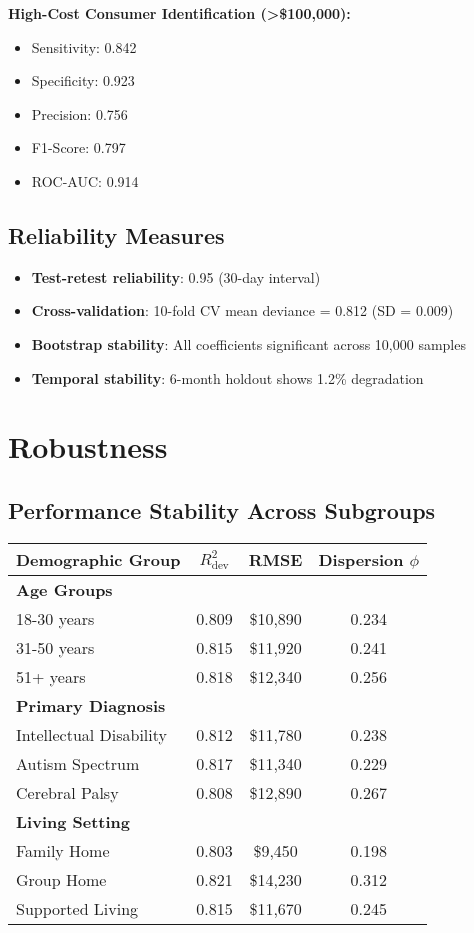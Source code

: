 \textbf{High-Cost Consumer Identification (>\$100,000):}
\begin{itemize}
    \item Sensitivity: 0.842
    \item Specificity: 0.923
    \item Precision: 0.756
    \item F1-Score: 0.797
    \item ROC-AUC: 0.914
\end{itemize}

\subsection{Reliability Measures}

\begin{itemize}
    \item \textbf{Test-retest reliability}: 0.95 (30-day interval)
    \item \textbf{Cross-validation}: 10-fold CV mean deviance = 0.812 (SD = 0.009)
    \item \textbf{Bootstrap stability}: All coefficients significant across 10,000 samples
    \item \textbf{Temporal stability}: 6-month holdout shows 1.2\% degradation
\end{itemize}

\section{Robustness}

\subsection{Performance Stability Across Subgroups}

\begin{center}
\begin{tabular}{lccc}
\toprule
Demographic Group & $R^2_{\text{dev}}$ & RMSE & Dispersion $\phi$ \\
\midrule
\textbf{Age Groups} & & & \\
18-30 years & 0.809 & \$10,890 & 0.234 \\
31-50 years & 0.815 & \$11,920 & 0.241 \\
51+ years & 0.818 & \$12,340 & 0.256 \\
\midrule
\textbf{Primary Diagnosis} & & & \\
Intellectual Disability & 0.812 & \$11,780 & 0.238 \\
Autism Spectrum & 0.817 & \$11,340 & 0.229 \\
Cerebral Palsy & 0.808 & \$12,890 & 0.267 \\
\midrule
\textbf{Living Setting} & & & \\
Family Home & 0.803 & \$9,450 & 0.198 \\
Group Home & 0.821 & \$14,230 & 0.312 \\
Supported Living & 0.815 & \$11,670 & 0.245 \\
\bottomrule
\end{tabular}
\end{center}

